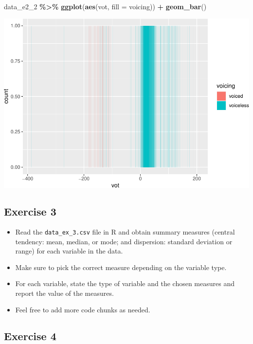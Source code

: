 \documentclass[
]{article}
\newenvironment{Shaded}{\begin{snugshade}}{\end{snugshade}}
\newcommand{\AttributeTok}[1]{\textcolor[rgb]{0.13,0.29,0.53}{#1}}
\newcommand{\FunctionTok}[1]{\textcolor[rgb]{0.13,0.29,0.53}{\textbf{#1}}}
\newcommand{\NormalTok}[1]{#1}
\newcommand{\SpecialCharTok}[1]{\textcolor[rgb]{0.81,0.36,0.00}{\textbf{#1}}}
\providecommand{\tightlist}{%
  \setlength{\itemsep}{0pt}\setlength{\parskip}{0pt}}
\begin{document}
\begin{Shaded}
\begin{Highlighting}[]
\NormalTok{data\_e2\_2 }\SpecialCharTok{\%\textgreater{}\%}
  \FunctionTok{ggplot}\NormalTok{(}\FunctionTok{aes}\NormalTok{(vot, }\AttributeTok{fill =}\NormalTok{ voicing)) }\SpecialCharTok{+}
  \FunctionTok{geom\_bar}\NormalTok{()}
\end{Highlighting}
\end{Shaded}

\includegraphics{analysis_files/figure-latex/e2-2-1.pdf}

\hypertarget{exercise-3}{%
\subsection{Exercise 3}\label{exercise-3}}

\begin{itemize}
\tightlist
\item
  Read the \texttt{data\_ex\_3.csv} file in R and obtain summary
  measures (central tendency: mean, median, or mode; and dispersion:
  standard deviation or range) for each variable in the data.
\item
  Make sure to pick the correct measure depending on the variable type.
\item
  For each variable, state the type of variable and the chosen measures
  and report the value of the measures.
\item
  Feel free to add more code chunks as needed.
\end{itemize}

\hypertarget{exercise-4}{%
\subsection{Exercise 4}\label{exercise-4}}
\end{document}
